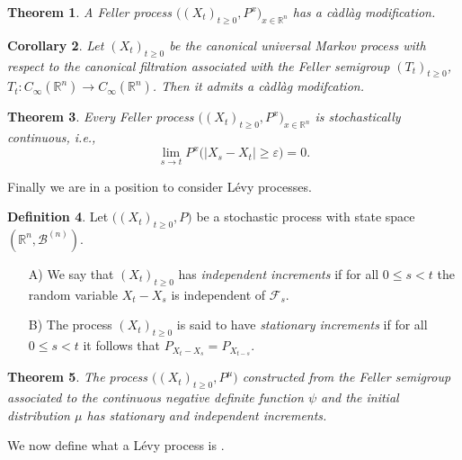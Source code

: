 \documentclass[a4paper, 12pt]{report}
\newtheorem{theorem}{Theorem}[section]
\newtheorem{cor}[theorem]{Corollary}
\theoremstyle{cor}
\theoremstyle{remark}
\theoremstyle{definition}
\newtheorem{defn}[theorem]{Definition}
\begin{document}
\begin{theorem}
A Feller process $\big((X_t)_{t \ge 0}, P^x\big)_{x \in \mathbb{R}^n}$ has a c\`adl\`ag modification.
\end{theorem}

\begin{cor}
Let $(X_t)_{t \ge 0}$ be the canonical universal Markov process with respect to the canonical filtration associated with the Feller semigroup $(T_t)_{t \ge 0}$, $T_t : C_\infty(\mathbb{R}^n) \to C_\infty(\mathbb{R}^n)$.  Then it admits a c\`adl\`ag modifcation.
\end{cor}

\begin{theorem}
Every Feller process $\big((X_t)_{t \ge 0}, P^x\big)_{x \in \mathbb{R}^n}$ is stochastically continuous, i.e.,
$$
\lim_{s \to t}P^x\big(|X_s - X_t| \ge \varepsilon\big) = 0.
$$
\end{theorem}

Finally we are in a position to consider L\'evy processes.

\begin{defn}
Let $\big((X_t)_{t \ge 0}, P\big)$ be a stochastic process with state space $(\mathbb{R}^n, \mathcal{B}^{(n)})$.
\begin{itemize}
\item[A)] We say that $(X_t)_{t \ge 0}$ has \emph{independent increments} if for all $0 \le s < t$ the random variable $X_t - X_s$ is independent of $\mathcal{F}_s$.

\item[B)] The process $(X_t)_{t \ge 0}$ is said to have \emph{stationary increments} if for all $0 \le s < t$ it follows that $P_{X_t - X_s} = P_{X_{t - s}}$.
\end{itemize}
\end{defn}

\begin{theorem}\label{FAaSSPT6}
The process $\big((X_t)_{t \ge 0}, P^\mu\big)$ constructed from the Feller semigroup associated to the continuous negative definite function $\psi$ and the initial distribution $\mu$ has stationary and independent increments.
\end{theorem}

We now define what a L\'evy process is \cite{Sato}.
\end{document}
